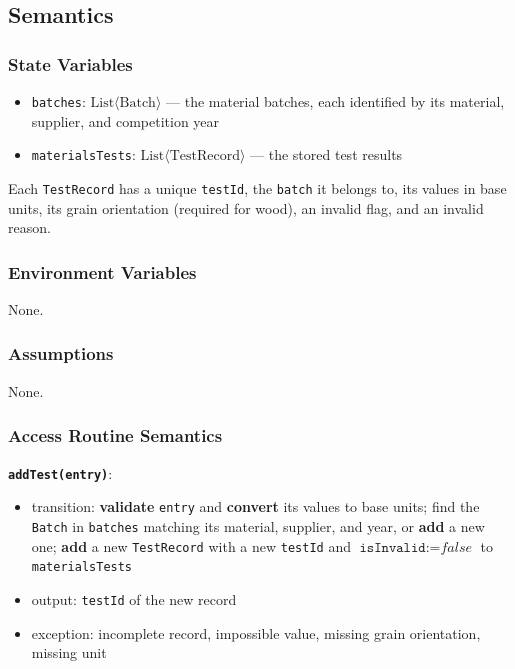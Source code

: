 \documentclass[12pt, titlepage]{article}
\begin{document}
\subsection{Semantics}

\subsubsection{State Variables}
\begin{itemize}
  \item \texttt{batches}: $\text{List}\langle \text{Batch} \rangle$ --- the material batches, each identified by its material, supplier, and competition year
  \item \texttt{materialsTests}: $\text{List}\langle \text{TestRecord} \rangle$ --- the stored test results
\end{itemize}

Each \texttt{TestRecord} has a unique \texttt{testId}, the \texttt{batch} it belongs to, its values in base units, its grain orientation (required for wood), an invalid flag, and an invalid reason.

\subsubsection{Environment Variables}
None.

\subsubsection{Assumptions}
None.

\subsubsection{Access Routine Semantics}

\textbf{\texttt{addTest(entry)}}:
\begin{itemize}
  \item transition: \textbf{validate} \texttt{entry} and \textbf{convert} its values to base units; find the \texttt{Batch} in \texttt{batches} matching its material, supplier, and year, or \textbf{add} a new one; \textbf{add} a new \texttt{TestRecord} with a new \texttt{testId} and $\texttt{isInvalid} := \textit{false}$ to \texttt{materialsTests}
  \item output: \texttt{testId} of the new record
  \item exception: incomplete record, impossible value, missing grain orientation, missing unit
\end{itemize}
\end{document}
